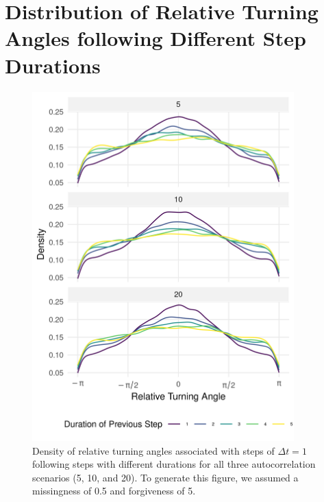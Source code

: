 \documentclass[abstract=on,10pt,a4paper,bibliography=totocnumbered]{article}
\begin{document}
\section{Distribution of Relative Turning Angles following Different Step Durations}
\begin{figure}[!ht]
  \begin{center}
  \includegraphics[width = 0.9\textwidth]{99_TurningAnglePreviousDuration.png}
  \caption{Density of relative turning angles associated with steps of $\Delta t
  = 1$ following steps with different durations for all three autocorrelation
  scenarios (5, 10, and 20). To generate this figure, we assumed a missingness
  of 0.5 and forgiveness of 5.}
  \label{PreviousDuration}
  \end{center}
\end{figure}

\newpage
\end{document}
